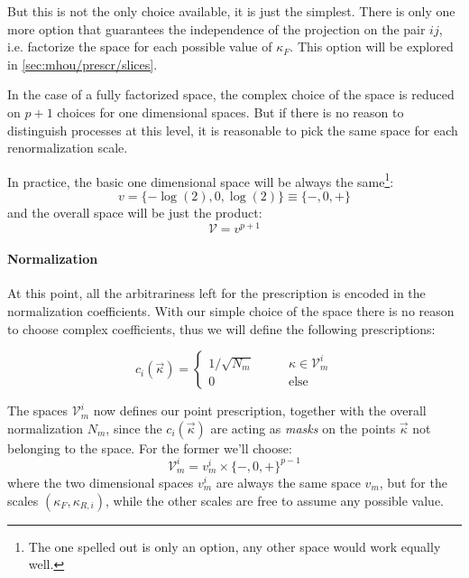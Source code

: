 But this is not the only choice available, it is just the simplest.
There is only one more option that guarantees the independence of the
projection on the pair $ij$, i.e. factorize the space for each possible value
of $\kappa_F$.
This option will be explored in \cref{sec:mhou/prescr/slices}.
\newline

In the case of a fully factorized space, the complex choice of the space is
reduced on $p + 1$ choices for one dimensional spaces.
But if there is no reason to distinguish processes at this level, it is
reasonable to pick the same space for each renormalization scale.

In practice, the basic one dimensional space will be always the same\footnote{
    The one spelled out is only an option, any other space would work equally
    well.
}:
\begin{equation}
    \label{eq:mhou/prescr/1dim-space}
    v = \{-\log(2), 0, \log(2)\} \equiv \{-, 0, +\}
\end{equation}
and the overall space will be just the product:
\begin{equation}
    \mathcal{V} = v^{p + 1}
\end{equation}

\paragraph{Normalization} At this point, all the arbitrariness left for the
prescription is encoded in the normalization coefficients.
With our simple choice of the space there is no reason to choose complex
coefficients, thus we will define the following prescriptions:

\begin{equation}
\label{eq:mhou/prescr/norm_coeff}
    c_i(\vec{\kappa}) = 
    \begin{cases}
        1 / \sqrt{N_m}     \qquad &\kappa \in \mathcal{V}^i_m\\
        0                  \qquad &\text{else}
    \end{cases}
\end{equation}

The spaces $\mathcal{V}_m^i$ now defines our point prescription, together with
the overall normalization $N_m$, since the $c_{i}(\vec{\kappa})$ are acting as \textit{masks} on the points $\vec{\kappa}$ not belonging to the space.
For the former we'll choose:
\begin{equation}
    \mathcal{V}_m^i = v_m^i \times \{-, 0, +\}^{p-1}
\end{equation}
where the two dimensional spaces $v_m^i$ are always the same space $v_m$, but
for the scales $(\kappa_F, \kappa_{R,i})$, while the other scales are free to
assume any possible value.

